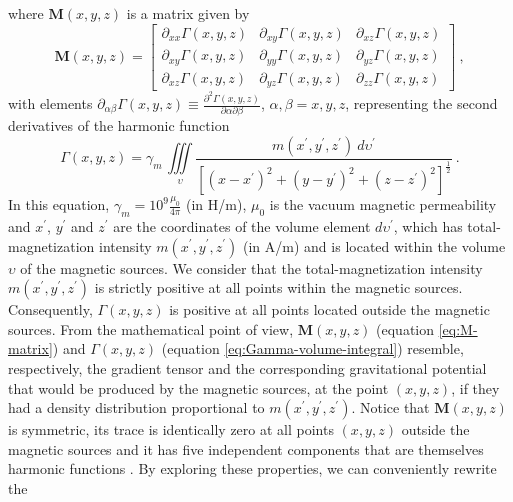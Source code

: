 where $\mathbf{M}(x, y, z)$ is a matrix given by
\begin{equation}
	\mathbf{M}(x, y, z) = \begin{bmatrix}
		\partial_{xx} \Gamma(x, y, z) & 
		\partial_{xy} \Gamma(x, y, z) &
		\partial_{xz} \Gamma(x, y, z) \\
		\partial_{xy} \Gamma(x, y, z) & 
		\partial_{yy} \Gamma(x, y, z) &
		\partial_{yz} \Gamma(x, y, z) \\
		\partial_{xz} \Gamma(x, y, z) & 
		\partial_{yz} \Gamma(x, y, z) &
		\partial_{zz} \Gamma(x, y, z)
	\end{bmatrix} \: ,
	\label{eq:M-matrix}
\end{equation}
with elements
$\partial_{\alpha\beta} \Gamma(x, y, z) \equiv 
\frac{\partial^{2} \Gamma(x, y, z)}{\partial \alpha \partial \beta}$, 
$\alpha, \beta = x, y, z$, representing the second derivatives of the harmonic
function
\begin{equation}
\Gamma(x, y, z) = \gamma_{m} \, \iiint\limits_{\upsilon} 
\frac{m(x^{\prime}, y^{\prime}, z^{\prime}) \: d\upsilon^{\prime}}
{\left[ (x-x^{\prime})^2 + (y-y^{\prime})^2 + (z-z^{\prime})^2 \right]^{\frac{1}{2}}} \: .
\label{eq:Gamma-volume-integral}
\end{equation}
In this equation, $\gamma_{m} = 10^{9} \frac{\mu_{0}}{4 \pi}$ (in H/m), 
$\mu_{0}$ is the vacuum magnetic permeability and 
$x^{\prime}$, $y^{\prime}$ and $z^{\prime}$ are the coordinates 
of the volume element $d \upsilon^{\prime}$, which has total-magnetization intensity
$m(x^{\prime}, y^{\prime}, z^{\prime})$ (in A/m) and is located within the 
volume $\upsilon$ of the magnetic sources.
We consider that the total-magnetization intensity $m(x^{\prime}, y^{\prime}, z^{\prime})$
is strictly positive at all points within the magnetic sources. Consequently,
$\Gamma(x, y, z)$ is positive at all points located outside the magnetic sources.
From the mathematical point of view, $\mathbf{M}(x, y, z)$ (equation \ref{eq:M-matrix})
and $\Gamma(x, y, z)$ (equation \ref{eq:Gamma-volume-integral}) resemble, respectively, 
the gradient tensor and the corresponding gravitational potential that would be produced by 
the magnetic sources, at the point $(x, y, z)$, if they had a density distribution proportional 
to $m(x^{\prime}, y^{\prime}, z^{\prime})$.
Notice that $\mathbf{M}(x, y, z)$ is symmetric, its trace is identically zero at all points 
$(x, y, z)$ outside the magnetic sources and it has five independent components that are 
themselves harmonic functions \citep{pedersen_rasmussen1990}.
By exploring these properties, we can conveniently rewrite the 
